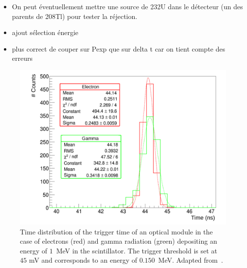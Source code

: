 \begin{itemize}
\item On peut éventuellement mettre une source de 232U dans le détecteur (un des parents de 208Tl) pour tester la réjection.
\item ajout sélection énergie
\item plus correct de couper sur Pexp que sur delta t car on tient compte des erreurs
\end{itemize}


\begin{figure}[!h]
  \centering
  \includegraphics[width=13cm]{timedifference/fig_timediff/Arnaud_RMS_PM.pdf}
  \caption{Time distribution of the trigger time of an optical module in the case of electrons (red) and gamma radiation (green) depositing an energy of $1$~MeV in the scintillator.
    The trigger threshold is set at $45$ mV and corresponds to an energy of $0.150$~MeV.
    Adapted from~\cite{HuberThesis}.
  \label{fig:Arnaud_RMS_PM}}
\end{figure}
